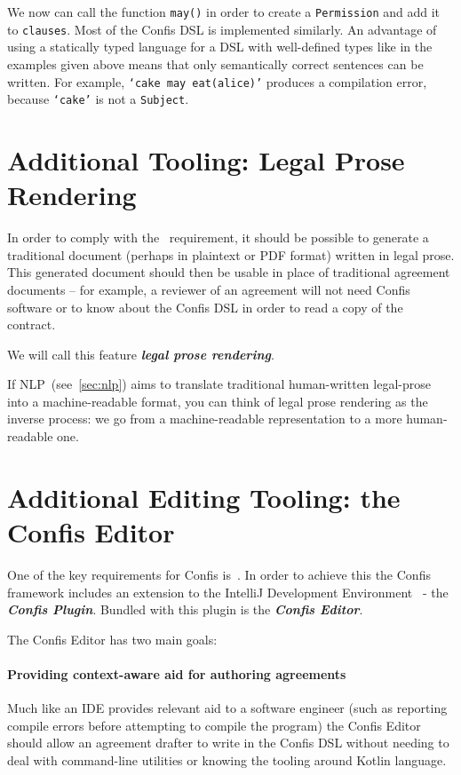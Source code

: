 We now can call the function \texttt{may()} in order to create a \texttt{Permission} and add it to \texttt{clauses}.
Most of the Confis DSL is implemented similarly.
An advantage of using a statically typed language for a DSL with well-defined types like in the examples given above means that only semantically correct sentences can be written.
For example, \texttt{`cake may eat(alice)'} produces a compilation error, because \texttt{`cake'} is not a \texttt{Subject}.




\section{Additional Tooling: Legal Prose Rendering}\label{sec:additional-tooling:doc-rendering}

In order to comply with the~ requirement, it should be possible to generate a traditional document (perhaps in plaintext or PDF format) written in legal prose.
This generated document should then be usable in place of traditional agreement documents -- for example, a reviewer of an agreement will not need Confis software or to know about the Confis DSL in order to read a copy of the contract.

We will call this feature \textbf{\emph{legal prose rendering}}.

If NLP~(see~\autoref{sec:nlp}) aims to translate traditional human-written legal-prose into a machine-readable format, you can think of legal prose rendering as the inverse process: we go from a machine-readable representation to a more human-readable one.


\section[The Confis Editor]{Additional Editing Tooling: the Confis Editor}\label{sec:confis-editor}

One of the key requirements for Confis is~.
In order to achieve this the Confis framework includes an extension to the IntelliJ Development Environment~\cite{intelliJRepo} - the \textbf{\emph{Confis Plugin}}.
Bundled with this plugin is the \textbf{\emph{Confis Editor}}.

The Confis Editor has two main goals:

\paragraph{Providing context-aware aid for authoring agreements} Much like an IDE provides relevant aid to a software engineer (such as reporting compile errors before attempting to compile the program) the Confis Editor should allow an agreement drafter to write in the Confis DSL without needing to deal with command-line utilities or knowing the tooling around Kotlin language.

